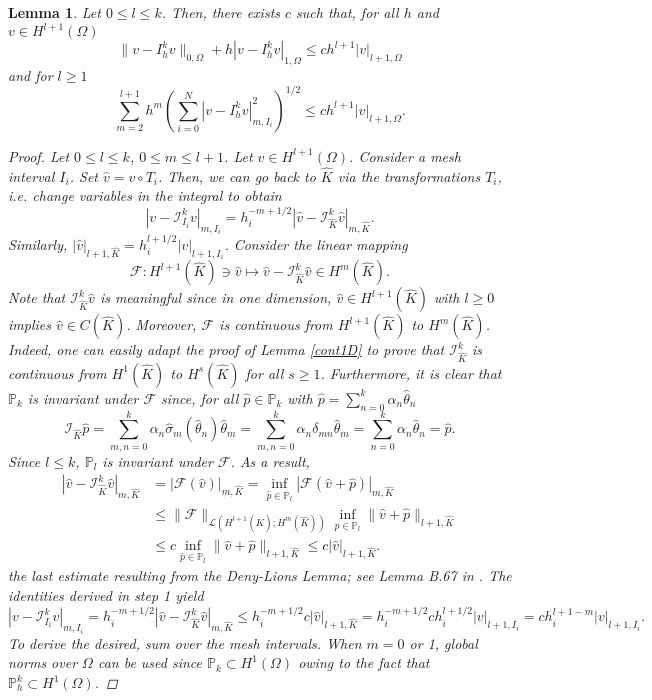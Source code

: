 \documentclass{article}
\newtheorem{lemma}{Lemma}
\begin{document}
\begin{lemma}\label{interpolationerrPk}
    Let $0 \le l \le k$. Then, there exists $c$ such that, for all $h$ and $v \in H^{l+1}(\Omega)$
    $$ \|v - I_h^k v\|_{0,\Omega} + h |v - I_h^k v|_{1,\Omega} \le c h^{l+1} |v|_{l+1,\Omega} $$
    and for $l \ge 1$
    $$ \sum_{m=2}^{l+1} h^m \left(\sum_{i=0}^N |v - I_h^k v|_{m,I_i}^2\right)^{1/2} \le c h^{l+1} |v|_{l+1,\Omega}. $$

\begin{proof}
    Let $0 \le l \le k$, $0 \le m \le l+1$. Let $v \in H^{l+1}(\Omega)$.
    Consider a mesh interval $I_i$. Set $\hat{v} = v \circ T_i$. Then, we can go back to $\hat{K}$ via the transformations $T_i$, i.e. change variables in the integral to obtain
    $$ |v - \mathcal{I}_{I_i}^k v|_{m,I_i} = h_i^{-m+1/2} |\hat{v} - \mathcal{I}_{\hat{K}}^k \hat{v}|_{m,\hat{K}}. $$
    Similarly, $|\hat{v}|_{l+1,\hat{K}} = h_i^{l+1/2} |v|_{l+1,I_i}$. 
    Consider the linear mapping
    $$ \mathcal{F}: H^{l+1}(\hat{K}) \ni \hat{v} \mapsto \hat{v} - \mathcal{I}_{\hat{K}}^k \hat{v} \in H^m(\hat{K}). $$
    Note that $\mathcal{I}_{\hat{K}}^k \hat{v}$ is meaningful since in one dimension, $\hat{v} \in H^{l+1}(\hat{K})$ with $l \ge 0$ implies $\hat{v} \in C(\hat{K})$. Moreover, $\mathcal{F}$ is continuous from $H^{l+1}(\hat{K})$ to $H^m(\hat{K})$. Indeed, one can easily adapt the proof of Lemma \ref{cont1D} to prove that $\mathcal{I}_{\hat{K}}^k$ is continuous from $H^1(\hat{K})$ to $H^s(\hat{K})$ for all $s \ge 1$. Furthermore, it is clear that $\mathbb{P}_k$ is invariant under $\mathcal{F}$ since, for all $\hat{p} \in \mathbb{P}_k$ with $\hat{p} = \sum_{n=0}^k \alpha_n \hat{\theta}_n$
    $$ \mathcal{I}_{\hat{K}} \hat{p} = \sum_{m,n=0}^k \alpha_n \hat{\sigma}_m(\hat{\theta}_n) \hat{\theta}_m = \sum_{m,n=0}^k \alpha_n \delta_{mn} \hat{\theta}_m = \sum_{n=0}^k \alpha_n \hat{\theta}_n = \hat{p}. $$
    Since $l \le k$, $\mathbb{P}_l$ is invariant under $\mathcal{F}$. As a result,
    \begin{align*}
        |\hat{v} - \mathcal{I}_{\hat{K}}^k \hat{v}|_{m,\hat{K}} &= |\mathcal{F}(\hat{v})|_{m,\hat{K}} = \inf_{\hat{p} \in \mathbb{P}_l} |\mathcal{F}(\hat{v} + \hat{p})|_{m,\hat{K}} \\
        &\le \|\mathcal{F}\|_{\mathcal{L}(H^{l+1}(\hat{K});H^m(\hat{K}))} \inf_{\hat{p} \in \mathbb{P}_l} \|\hat{v} + \hat{p}\|_{l+1,\hat{K}} \\
        &\le c \inf_{\hat{p} \in \mathbb{P}_l} \|\hat{v} + \hat{p}\|_{l+1,\hat{K}} \le c |\hat{v}|_{l+1,\hat{K}}.
    \end{align*}
    the last estimate resulting from the Deny-Lions Lemma; see Lemma B.67 in \cite{ern2004theory}. The identities derived in step 1 yield
    $$ |v - \mathcal{I}_{I_i}^k v|_{m,I_i} = h_i^{-m+1/2} |\hat{v} - \mathcal{I}_{\hat{K}}^k \hat{v}|_{m,\hat{K}} \le h_i^{-m+1/2} c |\hat{v}|_{l+1,\hat{K}} = h_i^{-m+1/2} c h_i^{l+1/2} |v|_{l+1,I_i} = c h_i^{l+1-m} |v|_{l+1,I_i}. $$
    To derive the desired, sum over the mesh intervals. When $m = 0$ or 1, global norms over $\Omega$ can be used since $\mathbb{P}_k \subset H^1(\Omega)$ owing to the fact that $\mathbb{P}_h^k\subset H^1(\Omega)$.
\end{proof}
\end{lemma}
\end{document}
